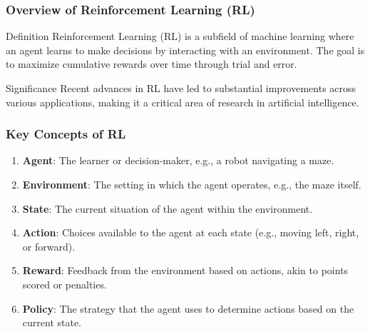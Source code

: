 \documentclass[aspectratio=169]{beamer}
\begin{document}
\frame{\titlepage}

\begin{frame}[fragile]
    \titlepage
\end{frame}

\begin{frame}[fragile]
    \frametitle{Overview of Reinforcement Learning (RL)}
    \begin{block}{Definition}
        Reinforcement Learning (RL) is a subfield of machine learning where an agent learns to make decisions by interacting with an environment. The goal is to maximize cumulative rewards over time through trial and error.
    \end{block}
    \begin{block}{Significance}
        Recent advances in RL have led to substantial improvements across various applications, making it a critical area of research in artificial intelligence.
    \end{block}
\end{frame}

\begin{frame}[fragile]
    \frametitle{Key Concepts of RL}
    \begin{enumerate}
        \item \textbf{Agent}: The learner or decision-maker, e.g., a robot navigating a maze.
        \item \textbf{Environment}: The setting in which the agent operates, e.g., the maze itself.
        \item \textbf{State}: The current situation of the agent within the environment.
        \item \textbf{Action}: Choices available to the agent at each state (e.g., moving left, right, or forward).
        \item \textbf{Reward}: Feedback from the environment based on actions, akin to points scored or penalties.
        \item \textbf{Policy}: The strategy that the agent uses to determine actions based on the current state.
    \end{enumerate}
\end{frame}
\end{document}
